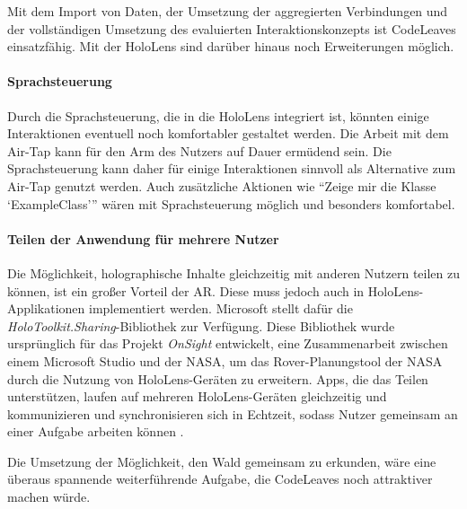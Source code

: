 Mit dem Import von Daten, der Umsetzung der aggregierten Verbindungen und der vollständigen Umsetzung des evaluierten Interaktionskonzepts ist CodeLeaves einsatzfähig. Mit der HoloLens sind darüber hinaus noch Erweiterungen möglich.

\paragraph*{Sprachsteuerung}

Durch die Sprachsteuerung, die in die HoloLens integriert ist, könnten einige Interaktionen eventuell noch komfortabler gestaltet werden. Die Arbeit mit dem Air-Tap kann für den Arm des Nutzers auf Dauer ermüdend sein. Die Sprachsteuerung kann daher für einige Interaktionen sinnvoll als Alternative zum Air-Tap genutzt werden. Auch zusätzliche Aktionen wie "`Zeige mir die Klasse \enquote*{ExampleClass}"' wären mit Sprachsteuerung möglich und besonders komfortabel.

\paragraph*{Teilen der Anwendung für mehrere Nutzer}
Die Möglichkeit, holographische Inhalte gleichzeitig mit anderen Nutzern teilen zu können, ist ein großer Vorteil der AR. Diese muss jedoch auch in HoloLens-Applikationen implementiert werden. Microsoft stellt dafür die \textit{HoloToolkit.Sharing}-Bibliothek zur Verfügung. Diese Bibliothek wurde ursprünglich für das Projekt \textit{OnSight} entwickelt, eine Zusammenarbeit zwischen einem Microsoft Studio und der NASA, um das Rover-Planungstool der NASA durch die Nutzung von HoloLens-Geräten zu erweitern. Apps, die das Teilen unterstützen, laufen auf mehreren HoloLens-Geräten gleichzeitig und kommunizieren und synchronisieren sich in Echtzeit, sodass Nutzer gemeinsam an einer Aufgabe arbeiten können \cite{microsoft2017sharing}.

Die Umsetzung der Möglichkeit, den Wald gemeinsam zu erkunden, wäre eine überaus spannende weiterführende Aufgabe, die CodeLeaves noch attraktiver machen würde.\\
